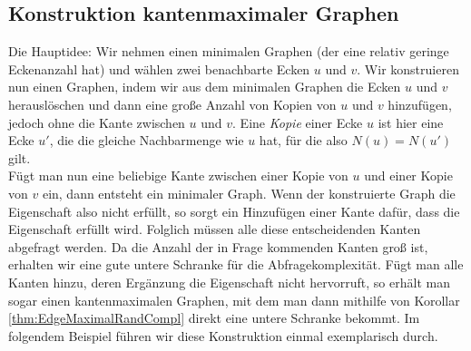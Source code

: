 \documentclass[a4paper]{scrreprt}
\theoremstyle{definition}
\begin{document}
\subsection{Konstruktion kantenmaximaler Graphen}
Die Hauptidee: Wir nehmen einen minimalen Graphen (der eine
relativ geringe Eckenanzahl hat) und wählen zwei benachbarte Ecken
$u$ und $v$. Wir konstruieren nun einen Graphen, indem wir aus dem
minimalen Graphen die Ecken $u$ und $v$ herauslöschen und dann eine große
Anzahl von Kopien von $u$ und $v$ hinzufügen, jedoch ohne die Kante
zwischen $u$ und $v$. Eine \emph{Kopie} einer Ecke $u$ ist hier
eine Ecke $u'$, die die gleiche Nachbarmenge wie $u$ hat, für
die also $N(u)=N(u')$ gilt.\\
Fügt man nun eine beliebige Kante zwischen einer Kopie von $u$ und einer
Kopie von $v$ ein, dann entsteht ein minimaler Graph. Wenn der
konstruierte Graph die Eigenschaft also nicht erfüllt, so sorgt 
ein Hinzufügen einer Kante dafür, dass die Eigenschaft erfüllt wird.
Folglich müssen alle diese entscheidenden Kanten abgefragt werden.
Da die Anzahl der in Frage kommenden Kanten groß ist, erhalten
wir eine gute untere Schranke für die Abfragekomplexität.
Fügt man alle Kanten hinzu, deren Ergänzung die Eigenschaft
nicht hervorruft, so erhält man sogar einen kantenmaximalen Graphen,
mit dem man dann mithilfe von Korollar \ref{thm:EdgeMaximalRandCompl}
direkt eine untere Schranke bekommt.
Im folgendem Beispiel führen wir diese Konstruktion einmal
exemplarisch durch.
\end{document}
